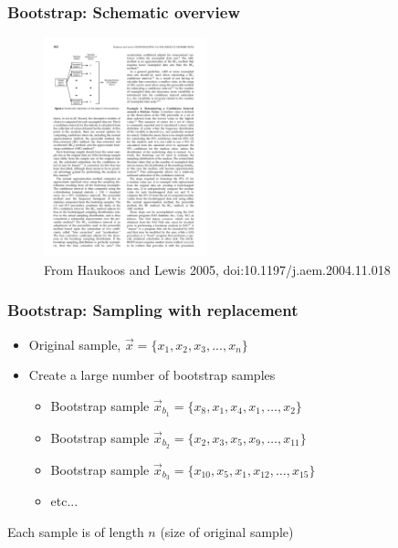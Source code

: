 \documentclass{beamer}
\begin{document}
\begin{frame}
\frametitle{Bootstrap: Schematic overview}

\begin{figure}
\begin{center}
  \includegraphics[height=2.5in]{bootstrap-schematic-haukoos-etal-2005.pdf}
\end{center}
\caption{From Haukoos and Lewis 2005, doi:10.1197/j.aem.2004.11.018}
\end{figure}

\end{frame}

\begin{frame}
\frametitle{Bootstrap: Sampling with replacement}

\begin{itemize}

\item Original sample, $\vec{x} = \{x_1, x_2, x_3, ..., x_n\}$

\item Create a large number of bootstrap samples

  \begin{itemize}
    \item Bootstrap sample $\vec{x}_{b_1} = \{x_8, x_1, x_4, x_1, \ldots, x_2\}$ 
    \item Bootstrap sample $\vec{x}_{b_2} = \{x_2, x_3, x_5, x_9, \ldots,x_{11}\}$
    \item Bootstrap sample $\vec{x}_{b_3} = \{x_{10}, x_5, x_1, x_{12}, \ldots, x_{15}\}$
    \item etc...
  \end{itemize}

\end{itemize}

Each sample is of length $n$ (size of original sample)

\end{frame}
\end{document}
